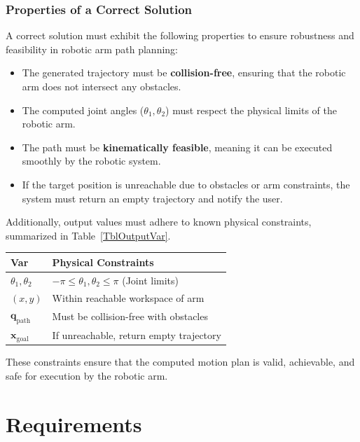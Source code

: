 \documentclass[12pt]{article}
\begin{document}
\subsubsection{Properties of a Correct Solution} \label{sec_CorrectSolution}

\noindent
A correct solution must exhibit the following properties to ensure robustness and feasibility in robotic arm path planning:

\begin{itemize}
    \item The generated trajectory must be \textbf{collision-free}, ensuring that the robotic arm does not intersect any obstacles.
    \item The computed joint angles (\(\theta_1, \theta_2\)) must respect the physical limits of the robotic arm.
    \item The path must be \textbf{kinematically feasible}, meaning it can be executed smoothly by the robotic system.
    \item If the target position is unreachable due to obstacles or arm constraints, the system must return an empty trajectory and notify the user.
\end{itemize}

\noindent
Additionally, output values must adhere to known physical constraints, summarized in Table~\ref{TblOutputVar}.

\begin{table}[!h]
\caption{Output Variables and Physical Constraints} \label{TblOutputVar}
\renewcommand{\arraystretch}{1.2}
\noindent \begin{longtable*}{l l} 
  \toprule
  \textbf{Var} & \textbf{Physical Constraints} \\
  \midrule 
  $\theta_1, \theta_2$ & $-\pi \leq \theta_1, \theta_2 \leq \pi$ (Joint limits) \\
  $(x, y)$ & Within reachable workspace of arm \\
  $\mathbf{q}_{\text{path}}$ & Must be collision-free with obstacles \\
  $\mathbf{x}_{\text{goal}}$ & If unreachable, return empty trajectory \\
  \bottomrule
\end{longtable*}
\end{table}

\noindent
These constraints ensure that the computed motion plan is valid, achievable, and safe for execution by the robotic arm.


\section{Requirements}
\end{document}
